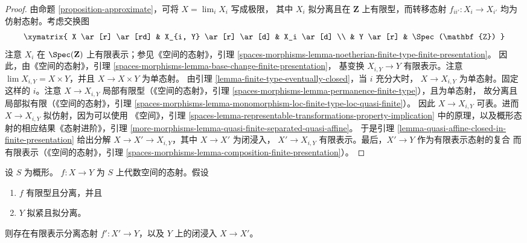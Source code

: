 \begin{proof}
由命题 \ref{proposition-approximate}，可将 $X = \lim_i X_i$ 写成极限，
其中 $X_i$ 拟分离且在 $\mathbf{Z}$ 上有限型，而转移态射
$f_{ii'} : X_i \to X_{i'}$ 均为仿射态射。考虑交换图
$$
\xymatrix{
X \ar[r] \ar[rd] & X_{i, Y} \ar[r] \ar[d] & X_i \ar[d] \\
& Y \ar[r] & \Spec(\mathbf{Z})
}
$$
注意 $X_i$ 在 $\Spec(\mathbf{Z})$ 上有限表示；参见《空间的态射》，引理
\ref{spaces-morphisms-lemma-noetherian-finite-type-finite-presentation}。
因此，由《空间的态射》，引理
\ref{spaces-morphisms-lemma-base-change-finite-presentation}，
基变换 $X_{i,Y} \to Y$ 有限表示。注意
$\lim X_{i,Y} = X \times Y$，并且 $X \to X \times Y$ 为单态射。
由引理 \ref{lemma-finite-type-eventually-closed}，当 $i$ 充分大时，
$X \to X_{i,Y}$ 为单态射。固定这样的 $i$。注意
$X \to X_{i,Y}$ 局部有限型（《空间的态射》，引理
\ref{spaces-morphisms-lemma-permanence-finite-type}），且为单态射，
故分离且局部拟有限（《空间的态射》，引理
\ref{spaces-morphisms-lemma-monomorphism-loc-finite-type-loc-quasi-finite}）。
因此 $X \to X_{i,Y}$ 可表。进而 $X \to X_{i,Y}$ 拟仿射，因为可以使用
《空间》，引理
\ref{spaces-lemma-representable-transformations-property-implication}
中的原理，以及概形态射的相应结果《态射进阶》，引理
\ref{more-morphisms-lemma-quasi-finite-separated-quasi-affine}。
于是引理 \ref{lemma-quasi-affine-closed-in-finite-presentation}
给出分解 $X \to X' \to X_{i,Y}$，其中 $X \to X'$ 为闭浸入，
$X' \to X_{i,Y}$ 有限表示。最后，$X' \to Y$ 作为有限表示态射的复合
而有限表示（《空间的态射》，引理
\ref{spaces-morphisms-lemma-composition-finite-presentation}）。
\end{proof}

\begin{proposition}
\label{proposition-separated-closed-in-finite-presentation}
设 $S$ 为概形。
$f : X \to Y$ 为 $S$ 上代数空间的态射。假设
\begin{enumerate}
\item $f$ 有限型且分离，并且
\item $Y$ 拟紧且拟分离。
\end{enumerate}
则存在有限表示分离态射 $f' : X' \to Y$，以及 $Y$ 上的闭浸入
$X \to X'$。
\end{proposition}

